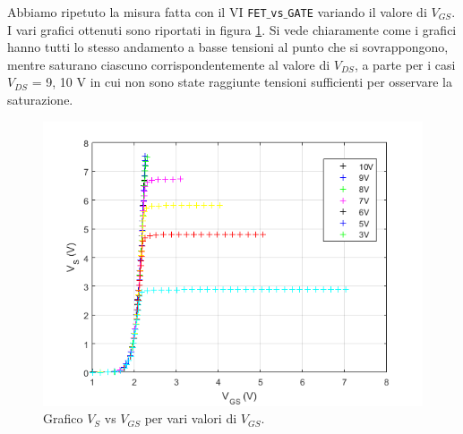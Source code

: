 \documentclass[journal, a4paper]{IEEEtran}
\begin{document}
Abbiamo ripetuto la misura fatta con il VI \texttt{FET$\_$vs$\_$GATE} variando il valore di $V_{GS}$. I vari grafici ottenuti sono riportati in figura \ref{fig:all}. Si vede chiaramente come i grafici hanno tutti lo stesso andamento a basse tensioni al punto che si sovrappongono, mentre saturano ciascuno corrispondentemente al valore di $V_{DS}$, a parte per i casi $V_{DS}$ = 9, 10 V in cui non sono state raggiunte tensioni sufficienti per osservare la saturazione.

\begin{figure}[htp]
\centering
\includegraphics[scale=.5]{all}
\caption{Grafico $V_S$ vs $V_{GS}$ per vari valori di $V_{GS}$.}
\label{fig:all}
\end{figure}
\end{document}
